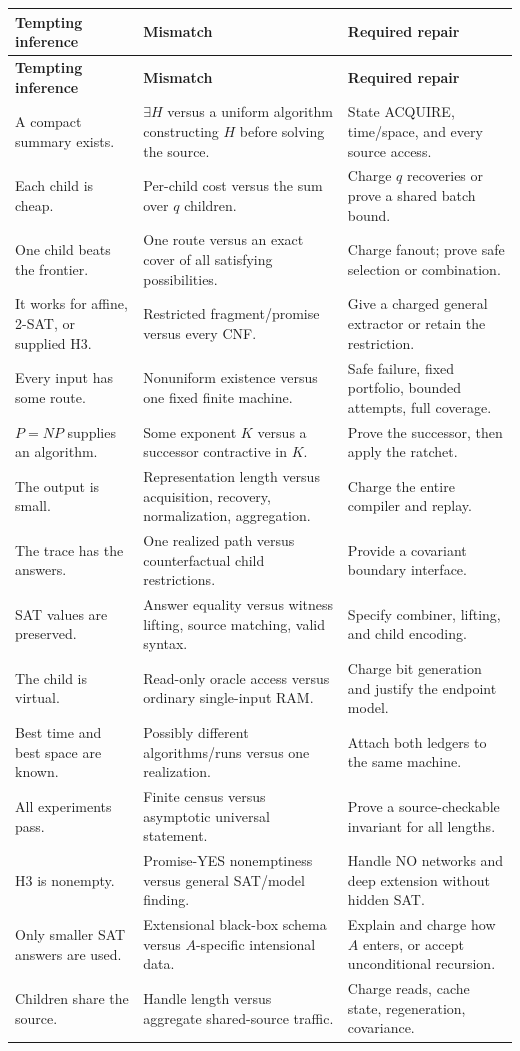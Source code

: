 \documentclass[11pt]{article}
\begin{document}
\begin{longtable}{p{}p{}p{}}
\toprule
\textbf{Tempting inference} & \textbf{Mismatch} & \textbf{Required repair}\\
\midrule
\endfirsthead
\toprule
\textbf{Tempting inference} & \textbf{Mismatch} & \textbf{Required repair}\\
\midrule
\endhead
A compact summary exists. & $\exists H$ versus a uniform algorithm constructing $H$ before solving the source. & State ACQUIRE, time/space, and every source access.\\
Each child is cheap. & Per-child cost versus the sum over $q$ children. & Charge $q$ recoveries or prove a shared batch bound.\\
One child beats the frontier. & One route versus an exact cover of all satisfying possibilities. & Charge fanout; prove safe selection or combination.\\
It works for affine, 2-SAT, or supplied H3. & Restricted fragment/promise versus every CNF. & Give a charged general extractor or retain the restriction.\\
Every input has some route. & Nonuniform existence versus one fixed finite machine. & Safe failure, fixed portfolio, bounded attempts, full coverage.\\
$P=NP$ supplies an algorithm. & Some exponent $K$ versus a successor contractive in $K$. & Prove the successor, then apply the ratchet.\\
The output is small. & Representation length versus acquisition, recovery, normalization, aggregation. & Charge the entire compiler and replay.\\
The trace has the answers. & One realized path versus counterfactual child restrictions. & Provide a covariant boundary interface.\\
SAT values are preserved. & Answer equality versus witness lifting, source matching, valid syntax. & Specify combiner, lifting, and child encoding.\\
The child is virtual. & Read-only oracle access versus ordinary single-input RAM. & Charge bit generation and justify the endpoint model.\\
Best time and best space are known. & Possibly different algorithms/runs versus one realization. & Attach both ledgers to the same machine.\\
All experiments pass. & Finite census versus asymptotic universal statement. & Prove a source-checkable invariant for all lengths.\\
H3 is nonempty. & Promise-YES nonemptiness versus general SAT/model finding. & Handle NO networks and deep extension without hidden SAT.\\
Only smaller SAT answers are used. & Extensional black-box schema versus $A$-specific intensional data. & Explain and charge how $A$ enters, or accept unconditional recursion.\\
Children share the source. & Handle length versus aggregate shared-source traffic. & Charge reads, cache state, regeneration, covariance.\\
\bottomrule
\end{longtable}
\end{document}
